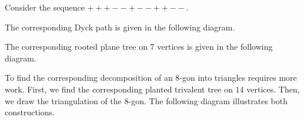 \documentclass[11pt]{article}
\begin{document}

Consider the sequence $+++--+--++--$.


The corresponding Dyck path is given in the following diagram.

\begin{center}
\end{center}

The corresponding rooted plane tree on 7 vertices is given in the following
diagram.

\begin{center}
\end{center}

To find the corresponding decomposition of an 8-gon into triangles requires
more work. First, we find the corresponding planted trivalent tree on $14$
vertices.
Then, we draw the triangulation of the 8-gon. The following diagram illustrates
both constructions.
\end{document}
